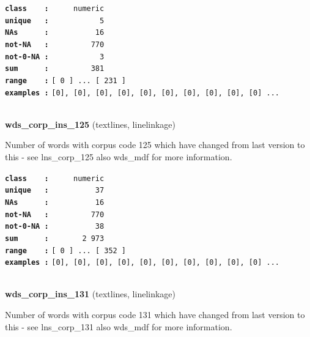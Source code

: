 \documentclass[]{article}
\begin{document}
\textbf{\texttt{class\ \ \ \ :}} \texttt{~~~~~numeric}\\
\textbf{\texttt{unique\ \ \ :}} \texttt{~~~~~~~~~~~5}\\
\textbf{\texttt{NAs\ \ \ \ \ \ :}} \texttt{~~~~~~~~~~16}\\
\textbf{\texttt{not-NA\ \ \ :}} \texttt{~~~~~~~~~770}\\
\textbf{\texttt{not-0-NA\ :}} \texttt{~~~~~~~~~~~3}\\
\textbf{\texttt{sum\ \ \ \ \ \ :}} \texttt{~~~~~~~~~381}\\
\textbf{\texttt{range\ \ \ \ :}}
\texttt{{[}\ 0\ {]}\ ...\ {[}\ 231\ {]}}\\
\textbf{\texttt{examples\ :}}
\texttt{{[}0{]},\ {[}0{]},\ {[}0{]},\ {[}0{]},\ {[}0{]},\ {[}0{]},\ {[}0{]},\ {[}0{]},\ {[}0{]},\ {[}0{]}\ ...}\\

~

\textbf{wds\_corp\_ins\_125} (textlines, linelinkage)

Number of words with corpus code 125 which have changed from last
version to this - see lns\_corp\_125 also wds\_mdf for more information.

\textbf{\texttt{class\ \ \ \ :}} \texttt{~~~~~numeric}\\
\textbf{\texttt{unique\ \ \ :}} \texttt{~~~~~~~~~~37}\\
\textbf{\texttt{NAs\ \ \ \ \ \ :}} \texttt{~~~~~~~~~~16}\\
\textbf{\texttt{not-NA\ \ \ :}} \texttt{~~~~~~~~~770}\\
\textbf{\texttt{not-0-NA\ :}} \texttt{~~~~~~~~~~38}\\
\textbf{\texttt{sum\ \ \ \ \ \ :}} \texttt{~~~~~~~2~973}\\
\textbf{\texttt{range\ \ \ \ :}}
\texttt{{[}\ 0\ {]}\ ...\ {[}\ 352\ {]}}\\
\textbf{\texttt{examples\ :}}
\texttt{{[}0{]},\ {[}0{]},\ {[}0{]},\ {[}0{]},\ {[}0{]},\ {[}0{]},\ {[}0{]},\ {[}0{]},\ {[}0{]},\ {[}0{]}\ ...}\\

~

\textbf{wds\_corp\_ins\_131} (textlines, linelinkage)

Number of words with corpus code 131 which have changed from last
version to this - see lns\_corp\_131 also wds\_mdf for more information.
\end{document}
